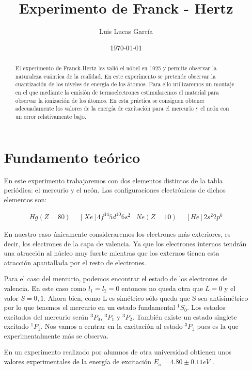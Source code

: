 \documentclass{article}
\author{Luis Lucas García}
\affil{Universidad de Alicante - Facultad de Ciencias - Grado en Física - Técnicas experimentales II - Grupo L1}
\title{Experimento de Franck - Hertz}
\date{\today}
\begin{document}
\maketitle

\begin{abstract}
El experimento de Franck-Hertz les valió el nóbel en 1925 y permite observar la naturaleza cuántica de la realidad. En este experimento se pretende observar la cuantización de los niveles de energía de los átomos. Para ello utilizaremos un montaje en el que mediante la emisión de termoelectrones estimularemos el material para observar la ionización de los átomos. En esta práctica se consiguen obtener adecuadamente los valores de la energía de excitación para el mercurio y el neón con un error relativamente bajo.
\end{abstract}

\tableofcontents

\section{Fundamento teórico}

En este experimento trabajaremos con dos elementos distintos de la tabla periódica: el mercurio y el neón. Las configuraciones electrónicas de dichos elementos son:

$$
\begin{array}{cc}
Hg (Z = 80) = [Xe]4f^{14} 5d^{10} 6s^2 & Ne (Z = 10) = [He] 2s^2 2p^6
\end{array}
$$

En nuestro caso únicamente consideraremos los electrones más exteriores, es decir, los electrones de la capa de valencia. Ya que los electrones internos tendrán una atracción al núcleo muy fuerte mientras que los externos tienen esta atracción apantallada por el resto de electrones.

Para el caso del mercurio, podemos encontrar el estado de los electrones de valencia. En este caso como $l_1 = l_2 = 0$ entonces no queda otra que $L = 0$ y el valor $S = 0, 1$. Ahora bien, como L es simétrico sólo queda que S sea antisimétrico por lo que tenemos el mercurio en un estado fundamental $^1S_0$. Los estados excitados del mercurio serán $^3P_0$, $^3P_1$ y $^3P_2$. También existe un estado singlete excitado $^1P_1$. Nos vamos a centrar en la excitación al estado $^3P_1$ pues es la que experimentalmente más se observa.

En un experimento realizado por alumnos de otra universidad obtienen unos valores experimentales de la energía de excitación $E_a = 4.80 \pm 0.11 eV$ \cite{UnivBonn}.
\end{document}
